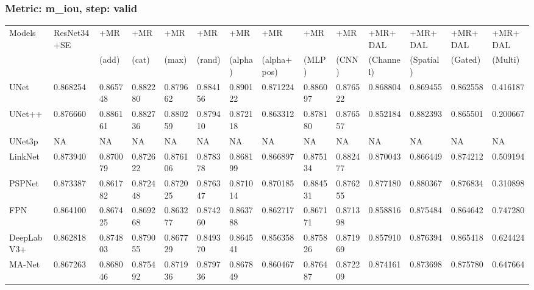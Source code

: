 \documentclass{article}
\begin{document}
\subsubsection{Metric: m\_iou, step: valid}
\begin{tabular}{llllllllllllll}
\toprule
Models & ResNet34+SE & +MR  & +MR  & +MR  & +MR  & +MR  & +MR  & +MR  & +MR  & +MR+DAL & +MR+DAL & +MR+DAL & +MR+DAL \\
       &             &  (add) &  (cat) &  (max) &  (rand) &  (alpha) &  (alpha+pos) &  (MLP) &  (CNN) & (Channel) & (Spatial) & (Gated) & (Multi) \\
\midrule
UNet & 0.868254 & 0.865748 & 0.882280 & 0.879662 & 0.884156 & 0.890122 & 0.871224 & 0.886097 & 0.876522 & 0.868804 & 0.869455 & 0.862558 & 0.416187 \\
UNet++ & 0.876660 & 0.886161 & 0.882736 & 0.880259 & 0.879410 & 0.872118 & 0.863312 & 0.878180 & 0.876557 & 0.852184 & 0.882393 & 0.865501 & 0.200667 \\
UNet3p & NA & NA & NA & NA & NA & NA & NA & NA & NA & NA & NA & NA & NA \\
LinkNet & 0.873940 & 0.870079 & 0.872622 & 0.876106 & 0.878378 & 0.868199 & 0.866897 & 0.875134 & 0.882477 & 0.870043 & 0.866449 & 0.874212 & 0.509194 \\
PSPNet & 0.873387 & 0.861782 & 0.872448 & 0.872025 & 0.876347 & 0.871014 & 0.870185 & 0.884531 & 0.876255 & 0.877180 & 0.880367 & 0.876834 & 0.310898 \\
FPN & 0.864100 & 0.867425 & 0.869268 & 0.863277 & 0.874260 & 0.863788 & 0.862717 & 0.867171 & 0.871398 & 0.858816 & 0.875484 & 0.864642 & 0.747280 \\
DeepLabV3+ & 0.862818 & 0.874803 & 0.879055 & 0.867729 & 0.849370 & 0.864541 & 0.856358 & 0.875826 & 0.871969 & 0.857910 & 0.876394 & 0.865418 & 0.624424 \\
MA-Net & 0.867263 & 0.868046 & 0.875492 & 0.871936 & 0.879736 & 0.867849 & 0.860467 & 0.876487 & 0.872209 & 0.874161 & 0.873698 & 0.875780 & 0.647664 \\
\bottomrule
\end{tabular}
\end{document}
